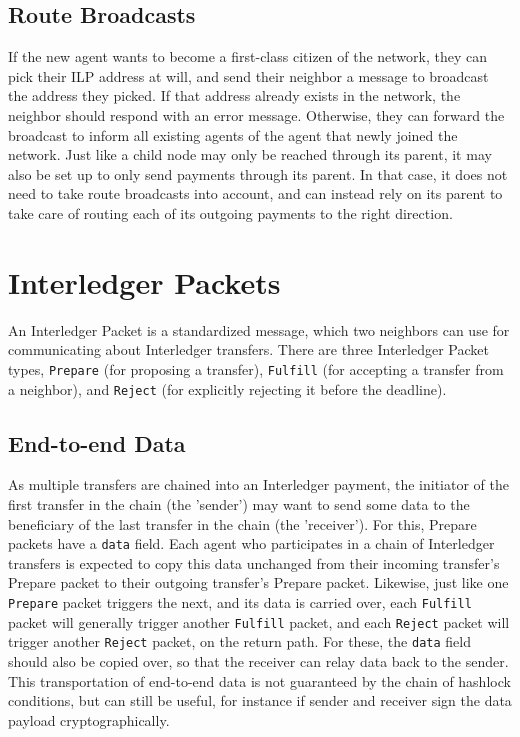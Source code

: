 \documentclass[11pt,twoside,a4paper]{article}
\begin{document}
\subsection{Route Broadcasts}
If the new agent wants to become a first-class citizen of the network, they can pick their ILP address at will, and send their neighbor a message to broadcast the address they picked.
If that address already exists in the network, the neighbor should respond with an error message. Otherwise, they can forward the broadcast to inform all existing agents of the agent
that newly joined the network. Just like a child node may only be reached through its parent, it may also be set up to only send payments through its parent. In that case, it does not need
to take route broadcasts into account, and can instead rely on its parent to take care of routing each of its outgoing payments to the right direction.

\section{Interledger Packets}
An Interledger Packet is a standardized message, which two neighbors can use for communicating about Interledger transfers. There are three Interledger Packet
types, {\tt Prepare} (for proposing a transfer), {\tt Fulfill} (for accepting a transfer from a neighbor), and {\tt Reject} (for explicitly rejecting it before the deadline).

\subsection{End-to-end Data}
As multiple transfers are chained into an Interledger payment, the initiator of the first transfer in the chain (the 'sender') may want to send some data to the
beneficiary of the last transfer in the chain (the 'receiver'). For this, Prepare packets have a {\tt data} field. Each agent who participates in a chain of Interledger
transfers is expected to copy this data unchanged from their incoming transfer's Prepare packet to their outgoing transfer's Prepare packet. Likewise,
just like one {\tt Prepare} packet triggers the next, and its data is carried over, each {\tt Fulfill} packet will generally trigger another {\tt Fulfill} packet, and each {\tt Reject}
packet will trigger another {\tt Reject} packet, on the return path. For these, the {\tt data} field should also be copied over, so that the receiver can relay data back
to the sender. This transportation of end-to-end data is not guaranteed by the chain of hashlock conditions, but can still be useful, for instance if sender and receiver sign
the data payload cryptographically.
\end{document}
